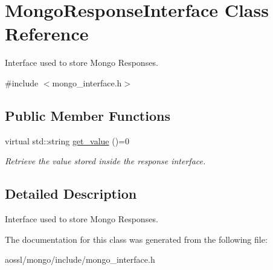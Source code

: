 \hypertarget{classMongoResponseInterface}{}\section{Mongo\+Response\+Interface Class Reference}
\label{classMongoResponseInterface}


Interface used to store Mongo Responses.  




{\ttfamily \#include $<$mongo\+\_\+interface.\+h$>$}

\subsection*{Public Member Functions}
\begin{DoxyCompactItemize}
\item 
virtual std\+::string \hyperlink{classMongoResponseInterface_a99ee074490255bdbffd3489dedccb568}{get\+\_\+value} ()=0\hypertarget{classMongoResponseInterface_a99ee074490255bdbffd3489dedccb568}{}\label{classMongoResponseInterface_a99ee074490255bdbffd3489dedccb568}

\begin{DoxyCompactList}\small\item\em Retrieve the value stored inside the response interface. \end{DoxyCompactList}\end{DoxyCompactItemize}


\subsection{Detailed Description}
Interface used to store Mongo Responses. 

The documentation for this class was generated from the following file\+:\begin{DoxyCompactItemize}
\item 
aossl/mongo/include/mongo\+\_\+interface.\+h\end{DoxyCompactItemize}
